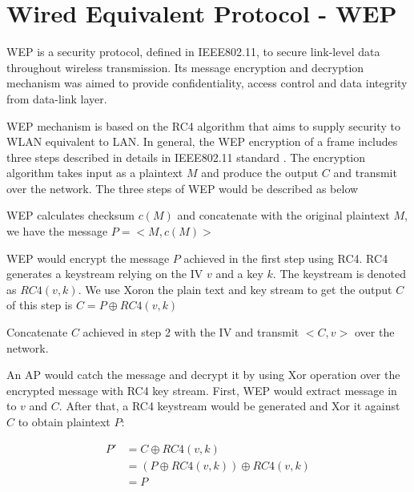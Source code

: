 \section{Wired Equivalent Protocol - WEP}


\ac{WEP} is a security protocol, defined in \ac{IEEE}802.11, to secure link-level data throughout wireless transmission. Its message encryption and decryption mechanism was aimed to provide confidentiality, access control and data integrity from data-link layer.

\ac{WEP} mechanism is based on the \ac{RC4} algorithm\cite{mousa2006evaluation} that aims to supply security to \ac{WLAN} equivalent to \ac{LAN}. In general, the \ac{WEP} encryption of a frame includes three steps described in details in \ac{IEEE}802.11 standard \cite{al2006ieee}. The encryption algorithm takes input as a plaintext $M$ and produce the output $C$ and transmit over the network. The three steps of \ac{WEP} would be described as below
\begin{steps}
	\item \ac{WEP} calculates checksum $c(M)$ and concatenate with the original plaintext $M$, we have the message $P = <M, c(M)>$
	\item \ac{WEP} would encrypt the message $P$ achieved in the first step using \ac{RC4}. \ac{RC4} generates a keystream relying on the \ac{IV} $v$ and a key $k$. The keystream is denoted as $RC4(v,k)$. We use \ac{Xor}on the plain text and key stream to get the output $C$ of this step is $C = P \oplus RC4(v,k)$
	\item Concatenate $C$ achieved in step 2 with the \ac{IV} and transmit $<C, v>$ over the network.
\end{steps}

An \ac{AP} would catch the message and decrypt it by using \ac{Xor} operation over the encrypted message with \ac{RC4} key stream.  First, \ac{WEP} would extract message in to $v$ and $C$. After that, a \ac{RC4} keystream would be generated and \ac{Xor} it against $C$ to obtain plaintext $P$:
\begin{center}
	\begin{align}
	P'&= C \oplus RC4(v, k) \\
	&= (P \oplus RC4(v, k)) \oplus RC4(v, k) \\
	&= P
	\end{align}
\end{center}

